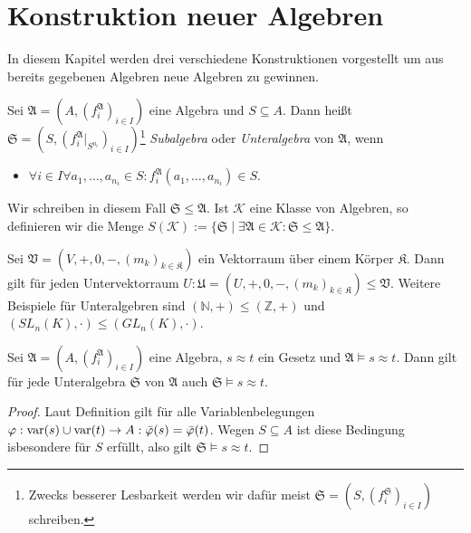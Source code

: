 \section{Konstruktion neuer Algebren}

In diesem Kapitel werden drei verschiedene Konstruktionen vorgestellt um aus bereits gegebenen Algebren neue Algebren zu gewinnen.

\begin{definition}
    Sei $\mathfrak{A}=(A,(f^\mathfrak{A}_i)_{i\in I})$ eine Algebra und $S\subseteq A$. Dann heißt $\mathfrak{S}=(S,(f^\mathfrak{A}_i|_{S^{n_i}})_{i\in I})$\footnote{Zwecks besserer Lesbarkeit werden wir dafür meist $\mathfrak{S}=(S,(f^\mathfrak{S}_i)_{i\in I})$ schreiben.}
    \emph{Subalgebra} oder \emph{Unteralgebra} von $\mathfrak{A}$, wenn
    \begin{itemize}[topsep=0pt, label={--}]
        \item $\forall i\in I\forall a_1,\ldots,a_{n_i}\in S:f^\mathfrak{A}_i(a_1,\ldots,a_{n_i})\in S.$
    \end{itemize}
    Wir schreiben in diesem Fall $\mathfrak{S}\le \mathfrak{A}$. Ist $\mathcal{K}$ eine Klasse von Algebren,
    so definieren wir die Menge $S(\mathcal{K}):=\{\mathfrak{S} \mid \exists \mathfrak{A}\in \mathcal{K}:\mathfrak{S}\le\mathfrak{A}\}$.
\end{definition}

\begin{example}
    Sei $\mathfrak{V}=(V,+,0,-,(m_k)_{k\in\mathfrak{K}})$ ein Vektorraum über einem Körper $\mathfrak{K}$. Dann gilt für
    jeden Untervektorraum $U:\mathfrak{U}=(U,+,0,-,(m_k)_{k\in\mathfrak{K}})\le \mathfrak{V}$. Weitere
    Beispiele für Unteralgebren sind $(\mathbb{N},+)\le(\mathbb{Z},+)$ und $(SL_n(K),\cdot)\le (GL_n(K),\cdot)$.
\end{example}

\begin{proposition}\label{prop:unteralgebra}
    Sei $\mathfrak{A}=(A,(f^\mathfrak{A}_i)_{i\in I})$ eine Algebra, $s\approx t$ ein Gesetz und $\mathfrak{A}\models s\approx t$.
    Dann gilt für jede Unteralgebra $\mathfrak{S}$ von $\mathfrak{A}$ auch $\mathfrak{S}\models s\approx t$.
\end{proposition}

\begin{proof}
    Laut Definition gilt für alle Variablenbelegungen $\varphi:\operatorname{var}(s)\cup \operatorname{var}(t)\to A:\bar{\varphi}(s)=\bar{\varphi}(t)$.
    Wegen $S\subseteq A$ ist diese Bedingung isbesondere für $S$ erfüllt, also gilt $\mathfrak{S}\models s\approx t$.
\end{proof}

